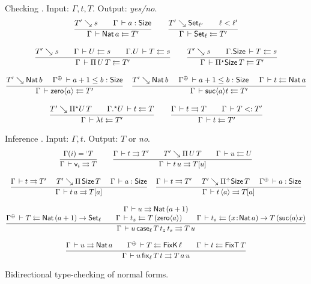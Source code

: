 \begin{figure}[htbp]
\flushleft
\hrulefill
\\[1ex]
Checking .
Input: $\Gamma,t,T$.
Output: \emph{yes/no}.
\begin{gather*}
  \ru{T' \evalsto s \qquad
      \Gamma \der a : \Size
    }{\Gamma \der \Nat a \jchk T'}
\qquad
  \ru{T' \evalsto \Set[\ell'] \qquad \ell < \ell'
    }{\Gamma \der \Set[\ell] \jchk T'}
\\[2ex]
  \ru{T' \evalsto s \qquad
      \Gamma \der U \jchk s \qquad
      \cext \Gamma U \der T \jchk s
    }{\Gamma \der \piT U T \jchk T'}
\qquad
  \ru{T' \evalsto s \qquad
      \cext \Gamma \Size \der T \jchk s
    }{\Gamma \der \epiT \Size T \jchk T'}
\\[2ex]
  \ru{T' \evalsto \Nat b \quad \
      \resurrect \Gamma \der a+1 \leq b : \Size
    }{\Gamma \der \zero a \jchk T'}
\quad
  \ru{T' \evalsto \Nat b \quad \
      \resurrect \Gamma \der a+1 \leq b : \Size \quad \
      \Gamma \der t \jchk \Nat a
    }{\Gamma \der \suc a t \jchk T'}
\\[2ex]
  \ru{T' \evalsto \epiT U T \qquad
      \eext \Gamma U \der t \jchk T
    }{\Gamma \der \lambda t \jchk T'}
\qquad
  \ru{\Gamma \der t \jinf T \qquad \Gamma \der T \asub T'
    }{\Gamma \der t \jchk T'}
\end{gather*}

Inference .
Input: $\Gamma,t$.
Output: $T$ or \emph{no}.
\begin{gather*}
  \ru{\Gamma(i) = \erann[\noterased] T
    }{\Gamma \der \ind i \jinf T}
\qquad
  \ru{\Gamma \der t \jinf T' \qquad
      T' \evalsto \piT U T \qquad
      \Gamma \der u \jchk U
    }{\Gamma \der t\, u \jinf T[u]}
\\[2ex]
  \ru{\Gamma \der t \jinf T' \quad \
      T' \evalsto \piT \Size T \quad \
      \Gamma \der a : \Size
    }{\Gamma \der t\,a \jinf T[a]}
\quad
  \ru{\Gamma \der t \jinf T' \quad \
      T' \evalsto \erpiT \Size T \quad \
      \resurrect\Gamma \der a : \Size
    }{\Gamma \der t\,\ann a \jinf T[a]}
\\[2ex]
  \ru{\Gamma \der u \jinf \Nat (a+1) \\
      \resurrect\Gamma \der T \jchk \Nat (a+1) \to \Set[\ell] \qquad
      \Gamma \der t_z \jchk T\,(\zero a) \qquad
      \Gamma \der t_s \jchk \funT x {\Nat a} {T\,(\suc a x)}
    }{\Gamma \der u\, \case[\ell] T {t_z} {t_s} \jinf T\,u}
\\[2ex]
  \ru{\Gamma \der u \jinf \Nat a \qquad
      \resurrect\Gamma \der T \jchk \FixK\,\ell \qquad
      \Gamma \der t \jchk \FixT\,T
    }{\Gamma \der u\, \fix[\ell] T t \jinf T\,a\,u}
\end{gather*}
\hrulefill
\vspace{-2ex}
  \caption{Bidirectional type-checking of normal forms.}
  \label{fig:check}
\end{figure}


